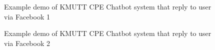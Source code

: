 \documentclass[12pt,oneside,openright,a4paper]{cpe-english-project}
\begin{document}
\begin{figure}[!h]\centering
{}
\caption{Example demo of KMUTT CPE Chatbot system that reply to user via Facebook 1}\label{fig:Example demo of KMUTT CPE Chatbot system that reply to user via Facebook 1}
\end{figure}
\begin{figure}[!h]\centering
{}
\caption{Example demo of KMUTT CPE Chatbot system that reply to user via Facebook 2}\label{fig:Example demo of KMUTT CPE Chatbot system that reply to user via Facebook 2}
\end{figure}
\end{document}
